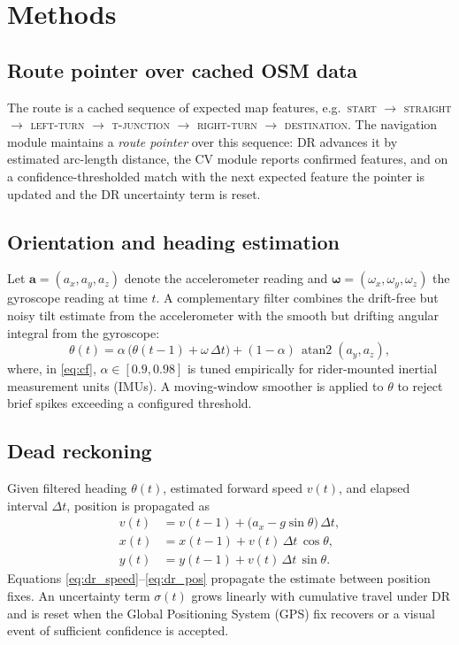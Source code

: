 \documentclass[conference]{IEEEtran}
\begin{document}
\section{Methods}
\label{sec:methods}

\subsection{Route pointer over cached OSM data}
The route is a cached sequence of expected map features, e.g.\ \textsc{start} $\rightarrow$ \textsc{straight} $\rightarrow$ \textsc{left-turn} $\rightarrow$ \textsc{t-junction} $\rightarrow$ \textsc{right-turn} $\rightarrow$ \textsc{destination}. The navigation module maintains a \emph{route pointer} over this sequence: DR advances it by estimated arc-length distance, the CV module reports confirmed features, and on a confidence-thresholded match with the next expected feature the pointer is updated and the DR uncertainty term is reset.

\subsection{Orientation and heading estimation}
Let $\mathbf{a}=(a_x,a_y,a_z)$ denote the accelerometer reading and $\boldsymbol{\omega}=(\omega_x,\omega_y,\omega_z)$ the gyroscope reading at time $t$. A complementary filter combines the drift-free but noisy tilt estimate from the accelerometer with the smooth but drifting angular integral from the gyroscope:
\begin{equation}
\theta(t) = \alpha\,\big(\theta(t{-}1) + \omega\,\Delta t\big) + (1-\alpha)\,\operatorname{atan2}(a_y, a_z),
\label{eq:cf}
\end{equation}
where, in \eqref{eq:cf}, $\alpha \in [0.9, 0.98]$ is tuned empirically for rider-mounted inertial measurement units (IMUs). A moving-window smoother is applied to $\theta$ to reject brief spikes exceeding a configured threshold.

\subsection{Dead reckoning}
Given filtered heading $\theta(t)$, estimated forward speed $v(t)$, and elapsed interval $\Delta t$, position is propagated as
\begin{align}
v(t) &= v(t{-}1) + \big(a_x - g\sin\theta\big)\,\Delta t,
\label{eq:dr_speed}\\
x(t) &= x(t{-}1) + v(t)\,\Delta t\,\cos\theta,\\
y(t) &= y(t{-}1) + v(t)\,\Delta t\,\sin\theta.
\label{eq:dr_pos}
\end{align}
Equations \eqref{eq:dr_speed}--\eqref{eq:dr_pos} propagate the estimate between position fixes. An uncertainty term $\sigma(t)$ grows linearly with cumulative travel under DR and is reset when the Global Positioning System (GPS) fix recovers or a visual event of sufficient confidence is accepted.
\end{document}
